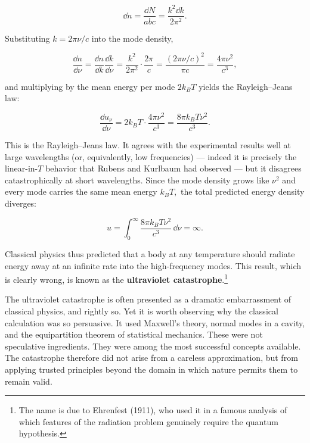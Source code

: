 \begin{linenomath}
    \begin{equation}
        \dd n = \frac{\dd N}{abc} = \frac{ k^2 \dd k}{2\pi^2}.
    \end{equation}
\end{linenomath}
Substituting $k=2\pi \nu/c$ into the mode density,
\begin{linenomath}
    \begin{equation}
        \frac{\dd n}{\dd\nu}
        =\frac{\dd n}{\dd k}\frac{\dd k}{\dd\nu}
        =\frac{k^{2}}{2\pi^{2}}\cdot\frac{2\pi}{c}
        =\frac{(2\pi\nu/c)^{2}}{\pi c}
        =\frac{4\pi\nu^{2}}{c^{3}},
    \end{equation}
\end{linenomath}
and multiplying by the mean energy per mode $2k_{B}T$ yields the Rayleigh--Jeans law:
\begin{linenomath}
    \begin{equation}
        \frac{\dd u_\nu}{\dd \nu}
        = 2k_{B}T\cdot\frac{4\pi\nu^{2}}{c^{3}}
        = \frac{8\pi k_BT\nu^2}{c^3}.
    \end{equation}
\end{linenomath}
This is the Rayleigh--Jeans law. It agrees with the experimental results well at large wavelengths (or, equivalently, low frequencies) --- indeed it is precisely the linear-in-$T$ behavior that Rubens and Kurlbaum had observed --- but it disagrees catastrophically at short wavelengths. Since the mode density grows like $\nu^2$ and every mode carries the same mean energy $k_BT,$ the total predicted energy density diverges:
\begin{linenomath}
    \begin{equation}
        u=\int_0^\infty \frac{8\pi k_BT\nu^2}{c^3}\,\dd\nu=\infty.
    \end{equation}
\end{linenomath}
Classical physics thus predicted that a body at any temperature should radiate energy away at an infinite rate into the high-frequency modes. This result, which is clearly wrong, is known as the \textbf{ultraviolet catastrophe}.\footnote{The name is due to Ehrenfest (1911), who used it in a famous analysis of which features of the radiation problem genuinely require the quantum hypothesis.}

The ultraviolet catastrophe is often presented as a dramatic embarrassment of classical physics, and rightly so. Yet it is worth observing why the classical calculation was so persuasive. It used Maxwell's theory, normal modes in a cavity, and the equipartition theorem of statistical mechanics. These were not speculative ingredients. They were among the most successful concepts available. The catastrophe therefore did not arise from a careless approximation, but from applying trusted principles beyond the domain in which nature permits them to remain valid.

